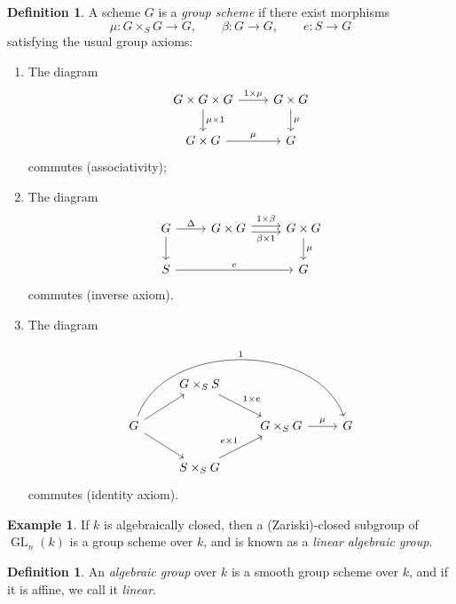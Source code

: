 \documentclass{amsart}
\theoremstyle{definition}
\newtheorem{defn}[thm]{Definition}
\newtheorem{exm}[thm]{Example}
\theoremstyle{remark}
\theoremstyle{plain}
\theoremstyle{definition}
\theoremstyle{remark}
\newcommand{\on}[1]{\operatorname{#1}}
\newcommand{\1}{\mathbf{1}}
\newcommand{\2}{\mathbf{2}}
\newcommand{\3}{\mathbf{3}}
\begin{document}
\begin{defn}
    A scheme \(G\) is a \textit{group scheme} if there exist morphisms
    \[ \mu \colon G \times_S G \to G, \qquad \beta \colon G \to G, \qquad e \colon S \to G \]
    satisfying the usual group axioms:
    \begin{enumerate}
        \item The diagram
        \begin{equation*}
        \begin{tikzcd}
            G \times G \times G \ar{r}{1 \times \mu} \ar{d}{\mu \times 1} & G \times G \ar{d}{\mu} \\
            G \times G \ar{r}{\mu} & G
        \end{tikzcd}
        \end{equation*}
        commutes (associativity);
        \item The diagram
        \begin{equation*}
        \begin{tikzcd}
            G \ar{r}{\Delta} \ar{d} & G \times G \ar[shift left=1]{r}{1 \times \beta} \ar[shift right=1, swap]{r}{\beta \times 1} & G \times G \ar{d}{\mu} \\
            S \ar{rr}{e} & & G
        \end{tikzcd}
        \end{equation*}
        commutes (inverse axiom).
        \item The diagram
        \begin{equation*}
        \begin{tikzcd}
            & G \times_S S \ar{dr}{1 \times e} \\
            G \ar[bend left=70]{rrr}{1} \ar{ur} \ar{dr} & & G \times_S G \ar{r}{\mu} & G \\
            & S \times_S G \ar{ur}{e \times 1}
        \end{tikzcd}
        \end{equation*}
        commutes (identity axiom).
    \end{enumerate}
\end{defn}

\begin{exm}
    If \(k\) is algebraically closed, then a (Zariski)-closed subgroup of \(\on{GL}_ n(k)\) is a group scheme over \(k\), and is known as a \textit{linear algebraic group}.
\end{exm}

\begin{defn}
    An \textit{algebraic group} over \(k\) is a smooth group scheme over \(k\), and if it is affine, we call it \textit{linear}.
\end{defn}
\end{document}
